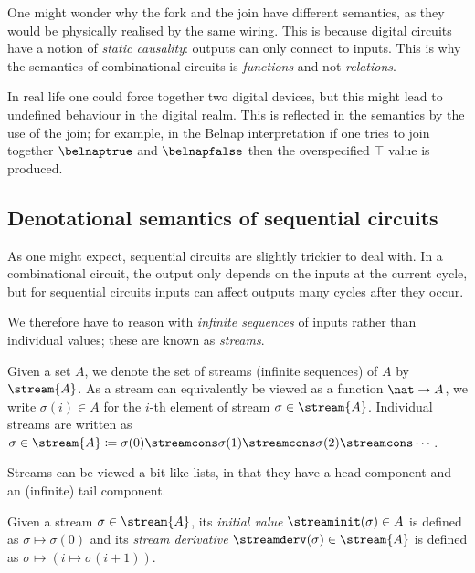 \begin{remark}
    One might wonder why the fork and the join have different semantics, as they
    would be physically realised by the same wiring.
    This is because digital circuits have a notion of \emph{static causality}:
    outputs can only connect to inputs.
    This is why the semantics of combinational circuits is \emph{functions} and
    not \emph{relations}.

    In real life one could force together two digital devices, but this might
    lead to undefined behaviour in the digital realm.
    This is reflected in the semantics by the use of the join; for example, in
    the Belnap interpretation if one tries to join together \(\belnaptrue\) and
    \(\belnapfalse\) then the overspecified \(\top\) value is produced.
\end{remark}

\subsection{Denotational semantics of sequential circuits}

As one might expect, sequential circuits are slightly trickier to deal with.
In a combinational circuit, the output only depends on the inputs at the current
cycle, but for sequential circuits inputs can affect outputs many cycles after
they occur.

We therefore have to reason with \emph{infinite sequences} of inputs rather than
individual values; these are known as \emph{streams}.

\begin{notation}
    Given a set \(A\), we denote the set of streams (infinite sequences) of
    \(A\) by \(\stream{A}\).
    As a stream can equivalently be viewed as a function \(\nat \to A\), we
    write \(\sigma(i) \in A\) for the \(i\)-th element of stream
    \(\sigma \in \stream{A}\).
    Individual streams are written as \(
    \sigma \in \stream{A}
    \coloneqq
    \sigma(0) \streamcons \sigma(1) \streamcons
    \sigma(2) \streamcons \cdots
    \).
\end{notation}

Streams can be viewed a bit like lists, in that they have a head component and
an (infinite) tail component.

\begin{definition}\label{def:stream-operations}
    Given a stream \(\sigma \in \stream{A}\), its \emph{initial value}
    \(\streaminit(\sigma) \in A\) is defined as \(\sigma \mapsto \sigma(0)\)
    and its \emph{stream derivative} \(\streamderv(\sigma) \in \stream{A}\) is
    defined as \(\sigma \mapsto (i \mapsto \sigma(i+1))\).
\end{definition}

